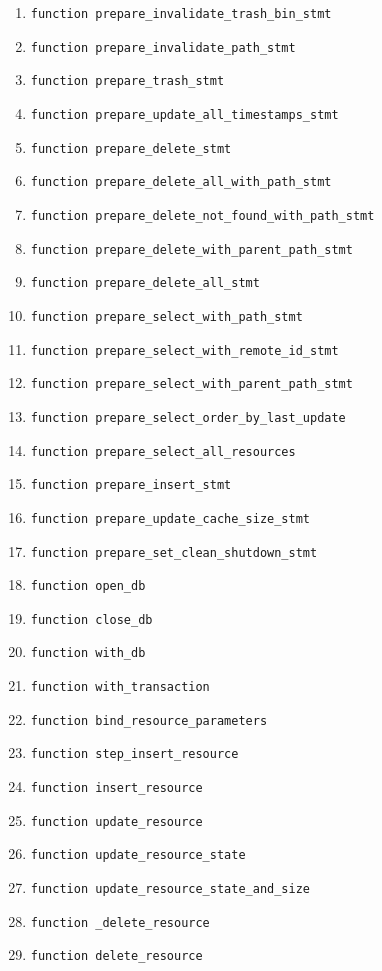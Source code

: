 \begin{enumerate}
    \item \verb|function prepare_invalidate_trash_bin_stmt|
    \item \verb|function prepare_invalidate_path_stmt|
    \item \verb|function prepare_trash_stmt|
    \item \verb|function prepare_update_all_timestamps_stmt|
    \item \verb|function prepare_delete_stmt|
    \item \verb|function prepare_delete_all_with_path_stmt|
    \item \verb|function prepare_delete_not_found_with_path_stmt|
    \item \verb|function prepare_delete_with_parent_path_stmt|
    \item \verb|function prepare_delete_all_stmt|
    \item \verb|function prepare_select_with_path_stmt|
    \item \verb|function prepare_select_with_remote_id_stmt|
    \item \verb|function prepare_select_with_parent_path_stmt|
    \item \verb|function prepare_select_order_by_last_update|
    \item \verb|function prepare_select_all_resources|
    \item \verb|function prepare_insert_stmt|
    \item \verb|function prepare_update_cache_size_stmt|
    \item \verb|function prepare_set_clean_shutdown_stmt|
    \item \verb|function open_db|
    \item \verb|function close_db|
    \item \verb|function with_db|
    \item \verb|function with_transaction|
    \item \verb|function bind_resource_parameters|
    \item \verb|function step_insert_resource|
    \item \verb|function insert_resource|
    \item \verb|function update_resource|
    \item \verb|function update_resource_state|
    \item \verb|function update_resource_state_and_size|
    \item \verb|function _delete_resource|
    \item \verb|function delete_resource|

\end{enumerate}
